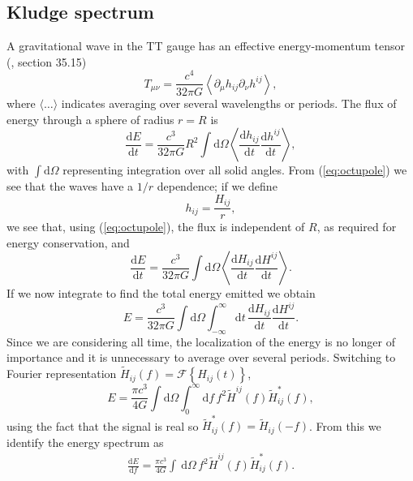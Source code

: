 \documentclass[useAMS,usedcolumn,usegraphicx,usenatbib]{mn2e}
\newcommand{\eqnref}[1]{(\ref{eq:#1})}
\newcommand{\dd}{\ensuremath{\mathrm{d}}}
\newcommand{\diff}[2]{\ensuremath{\frac{\dd {#1}}{\dd {#2}}}}
\newcommand{\intd}[4]{\ensuremath{\int_{#1}^{#2}{#3}\,\dd{#4}}}
\begin{document}
\subsection{Kludge spectrum}

A gravitational wave in the TT gauge has an effective energy-momentum tensor (\citealt{Misner1973}, section 35.15)
\begin{equation}
T_{\mu\nu} = \frac{c^4}{32\pi G}\left\langle\partial_\mu h_{ij} \partial_\nu h^{ij}\right\rangle,
\end{equation}
where $\langle\ldots\rangle$ indicates averaging over several wavelengths or periods. The flux of energy through a sphere of radius $r = R$ is
\begin{equation}
\diff{E}{t} = \frac{c^3}{32\pi G} R^2 \int{\dd\Omega}\left\langle\diff{h_{ij}}{t}\diff{h^{ij}}{t}\right\rangle,
\end{equation}
with $\int{\dd\Omega}$ representing integration over all solid angles. From \eqnref{octupole} we see that the waves have a $1/{r}$ dependence; if we define
\begin{equation}
h_{ij} = \frac{H_{ij}}{r},
\end{equation}
we see that, using \eqnref{octupole}, the flux is independent of $R$, as required for energy conservation, and
\begin{equation}
\diff{E}{t} = \frac{c^3}{32\pi G} \int{\dd\Omega}\left\langle\diff{H_{ij}}{t}\diff{H^{ij}}{t}\right\rangle.
\end{equation}
If we now integrate to find the total energy emitted we obtain
\begin{equation}
E = \frac{c^3}{32\pi G} \int{\dd\Omega}\int_{-\infty}^{\infty}{\dd t} \, \diff{H_{ij}}{t}\diff{H^{ij}}{t}.
\label{eq:integrate_E}
\end{equation}
Since we are considering all time, the localization of the energy is no longer of importance and it is unnecessary to average over several periods. Switching to Fourier representation $\widetilde{H}_{ij}(f) = \mathscr{F}\left\{H_{ij}(t)\right\}$,
\begin{equation}
E = \frac{\pi c^3}{4 G} \int{\dd\Omega}\int_{0}^{\infty}{\dd f} \, f^2 \widetilde{H}^{ij}(f)\widetilde{H}_{ij}^*(f),
\label{eq:total_E}
\end{equation}
using the fact that the signal is real so $\widetilde{H}_{ij}^*(f) = \widetilde{H}_{ij}(-f)$. From this we identify the energy spectrum as
\begin{align}
\diff{E}{f} = \frac{\pi c^3}{4 G} \intd{}{}{}{\Omega} \, f^2 \widetilde{H}^{ij}(f)\widetilde{H}_{ij}^*(f).
\label{eq:NK_dEdf}
\end{align}
\end{document}

